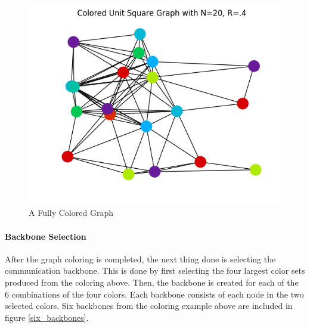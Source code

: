 \documentclass{article}
\begin{document}
    \begin{figure}
      \centering
      \label{colored_graph}
      \includegraphics[width=1 \textwidth]{walkthrough/final_colored}
      \caption{A Fully Colored Graph}
    \end{figure}

    \paragraph{Backbone Selection}
    After the graph coloring is completed, the next thing done is selecting the communication backbone.
    This is done by first selecting the four largest color sets produced from the coloring above.
    Then, the backbone is created for each of the 6 combinations of the four colors.
    Each backbone consists of each node in the two selected colors.
    Six backbones from the coloring example above are included in figure \ref{six_backbones}.
\end{document}
